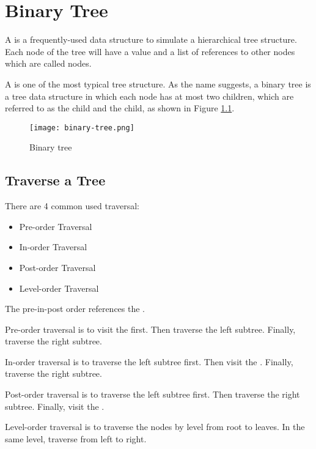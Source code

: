 
\chapter{Binary Tree}
\label{cha:binary-tree}

A  is a frequently-used data structure to simulate a hierarchical tree structure.
Each node of the tree will have a  value and a list of references to other nodes which are called  nodes.



A  is one of the most typical tree structure.
As the name suggests, a binary tree is a tree data structure in which each node has at most two children, which are referred to as the  child and the  child, as shown in Figure \ref{fig:binary-tree}.
\begin{figure}[!ht]
  \centering
  \texttt{[image: binary-tree.png]}
  \caption{Binary tree}
  \label{fig:binary-tree}
\end{figure}






\section{Traverse a Tree}
\label{sec:traverse-tree}

There are 4 common used traversal:
\begin{itemize}
\item Pre-order Traversal
\item In-order Traversal
\item Post-order Traversal
\item Level-order Traversal
\end{itemize}


The pre-in-post order references the .

Pre-order traversal is to visit the  first.
Then traverse the left subtree.
Finally, traverse the right subtree.

In-order traversal is to traverse the left subtree first.
Then visit the .
Finally, traverse the right subtree.

Post-order traversal is to traverse the left subtree first.
Then traverse the right subtree.
Finally, visit the .

Level-order traversal is to traverse the nodes by level from root to leaves.
In the same level, traverse from left to right.

